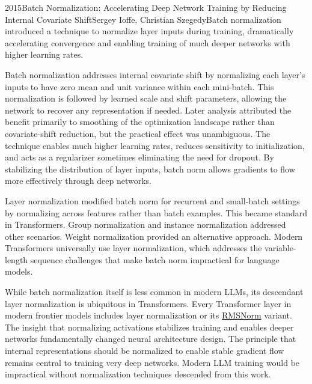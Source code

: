 
\begin{papersummary}{2015}{Batch Normalization: Accelerating Deep Network Training by Reducing Internal Covariate Shift}{Sergey Ioffe, Christian Szegedy}{Batch normalization introduced a technique to normalize layer inputs during training, dramatically accelerating convergence and enabling training of much deeper networks with higher learning rates.}

Batch normalization addresses internal covariate shift by normalizing each layer's inputs to have zero mean and unit variance within each mini-batch. This normalization is followed by learned scale and shift parameters, allowing the network to recover any representation if needed. Later analysis attributed the benefit primarily to smoothing of the optimization landscape rather than covariate-shift reduction, but the practical effect was unambiguous. The technique enables much higher learning rates, reduces sensitivity to initialization, and acts as a regularizer sometimes eliminating the need for dropout. By stabilizing the distribution of layer inputs, batch norm allows gradients to flow more effectively through deep networks.

Layer normalization modified batch norm for recurrent and small-batch settings by normalizing across features rather than batch examples. This became standard in Transformers. Group normalization and instance normalization addressed other scenarios. Weight normalization provided an alternative approach. Modern Transformers universally use layer normalization, which addresses the variable-length sequence challenges that make batch norm impractical for language models.

While batch normalization itself is less common in modern LLMs, its descendant layer normalization is ubiquitous in Transformers. Every Transformer layer in modern frontier models includes layer normalization or its \hyperref[paper:zhang-2019-rmsnorm]{RMSNorm} variant. The insight that normalizing activations stabilizes training and enables deeper networks fundamentally changed neural architecture design. The principle that internal representations should be normalized to enable stable gradient flow remains central to training very deep networks. Modern LLM training would be impractical without normalization techniques descended from this work.

\end{papersummary}

